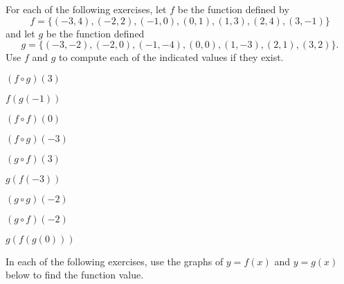 \documentclass[12pt]{book}
\theoremstyle{definition}
\begin{document}
For each of the following exercises, let $f$ be the function defined by \[f = \{(-3, 4), (-2, 2), (-1, 0), (0, 1), (1, 3), (2, 4), (3, -1)\}\] and let $g$ be the function defined \[g = \{(-3, -2), (-2, 0), (-1, -4), (0, 0), (1, -3), (2, 1), (3, 2)\}.\]  Use $f$ and $g$ to compute each of the indicated values if they exist.

\begin{enumerate}[resume]
\begin{multicols}{3}
\item $(f \circ g)(3)$
\item $f(g(-1))$
\item $(f \circ f)(0)$
\end{multicols}

\begin{multicols}{3}
\item $(f \circ g)(-3)$
\item $(g \circ f)(3)$
\item $g(f(-3))$
\end{multicols}

\begin{multicols}{3}
\item $(g \circ g)(-2)$
\item $(g \circ f)(-2)$
\item $g(f(g(0)))$
\end{multicols}
\end{enumerate}
\newpage
In each of the following exercises, use the graphs of $y=f(x)$ and $y=g(x)$ below to find the function value.
\end{document}
